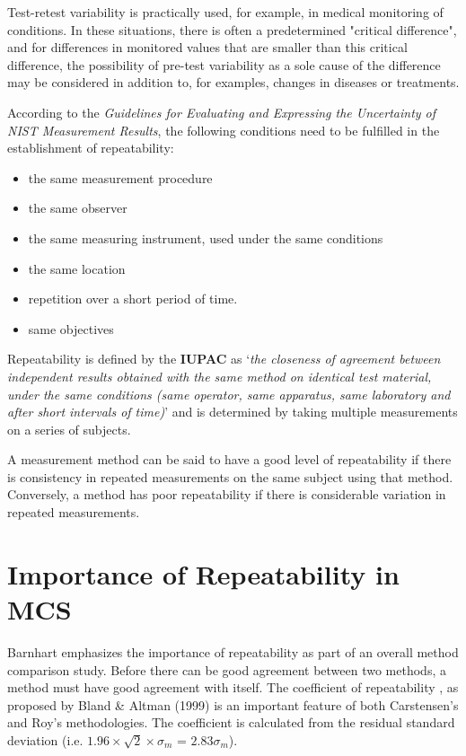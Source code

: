 \documentclass[12pt, a4paper]{report}
\theoremstyle{plain}
\theoremstyle{definition}
\theoremstyle{remark}
\begin{document}
	Test-retest variability is practically used, for example, in medical monitoring of conditions. In these situations, there is often a predetermined "critical difference", and for differences in monitored values that are smaller than this critical difference, the possibility of pre-test variability as a sole cause of the difference may be considered in addition to, for examples, changes in diseases or treatments.
	
	According to the \textit{Guidelines for Evaluating and Expressing the Uncertainty of NIST Measurement Results}, the following conditions need to be fulfilled in the establishment of repeatability:
	\begin{itemize}
		\item	the same measurement procedure
		\item	the same observer
		\item	the same measuring instrument, used under the same conditions
		\item	the same location
		\item	repetition over a short period of time.
		\item  same objectives
	\end{itemize}
	\bigskip
	
	Repeatability is defined by the \textbf{IUPAC} as `\textit{the closeness of agreement between independent results obtained with the same method on identical test material, under the same conditions (same
		operator, same apparatus, same laboratory and after short intervals of time)}'  and is determined by taking multiple measurements on a series of subjects.
	
	A measurement method can be said to have a good level of repeatability if there is consistency in repeated measurements on the same subject using that method. Conversely, a method has poor repeatability if there is considerable variation in repeated measurements.
	
	
	
	\newpage
	\section{Importance of Repeatability in MCS}
	
	
	
	Barnhart emphasizes the importance of repeatability as part of an overall method comparison study. Before there can be good agreement between two methods, a method must have good agreement with itself. The coefficient of repeatability , as proposed by Bland \& Altman (1999) is an important feature of both Carstensen's and Roy's methodologies. The coefficient is calculated from the residual standard deviation (i.e. $1.96 \times \sqrt{2} \times \sigma_m$ = $2.83 \sigma_m$).
	
\end{document}
